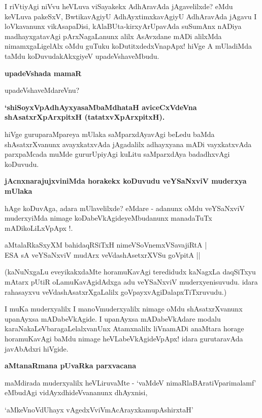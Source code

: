 I riVtiyAgi niVvu heVLuva viSayakekx AdhAravAda jAgavelilxde? eMdu keVLuva pakeSxV, BwtikavAgiyU AdhAyxtimxkavAgiyU AdhAravAda jAgavu I loVkavanunx vikAsapaDisi, kAlaBUta-kirxyArUpavAda suSumAnx nADiya madhayxgatavAgi pArxNagaLanunx alilx AsAvxdane mADi alilxMda nimamxgaLigelAlx oMdu guTuku koDutitxdedxVnapApx! hiVge A mUladiMda taMdu koDuvudakAkxgiyeV upadeVshaveMbudu.

{\bigskip
\noindent
{\large\bf upadeVshada mamaR}}\label{page83}
\medskip

\noindent
upadeVshaveMdareVnu? 

{\bf `shiSoyxVpAdhAyxyasaMbaMdhataH\label{83} aviceCxVdeVna shAsatxrXpArxpitxH (tatatxvXpArxpitxH). }

hiVge guruparaMpareya mUlaka saMparxdAyavAgi beLedu baMda shAsatxrXvanunx avayxkatxvAda jAgadalilx adhayxyana mADi vayxkatxvAda parxpaMcada muMde gururUpiyAgi kuLitu saMparxdAya badadhxvAgi koDuvudu.

{\bigskip
\noindent
{\large\bf jAcnxnarajujxviniMda horakekx koDuvudu veYSaNxviV muderxya mUlaka}}\label{page83a}
\medskip

\noindent
hAge koDuvAga, adara mUlavelilxde? eMdare - adanunx oMdu veYSaNxviV muderxyiMda nimage koDabeVkAgideyeMbudanunx manadaTuTx mADikoLiLxVpApx !.

\begin{shloka}
aMtalaRkaSxyXM bahidaqRSiTxH nimeVSoVnemxVSavajiRtA |\\\label{83a}
ESA sA veYSaNxviV mudArx veVdashAsetxrXVSu goVpitA ||
\end{shloka}

\noindent
(kaNuNxgaLu eveyikakxdaMte horamuKavAgi teredidudx kaNagxLa daqSiTxyu mAtarx pUtiR oLamuKavAgidAdxga adu veYSaNxviV muderxyenisuvudu. idara rahasayxvu veVdashAsatxrXgaLalilx goVpayxvAgiDalapxTiTxruvudu.) 

I muKa muderxyalilx I manoVmuderxyalilx nimage oMdu shAsatxrXvanunx upanAyxsa mADabeVkAgide. I upanAyxsa mADabeVkAdare modalu karaNakaLeVbaragaLelalxvanUnx Atamxnalilx liVnamADi anaMtara horage horamuKavAgi baMdu nimage heVLabeVkAgideVpApx! idara gurutaravAda javAbAdxri hiVgide.

{\bigskip
\noindent
{\large\bf aMtanaRmana pUvaRka parxvacana}}\label{page83b}
\medskip

\noindent
maMdirada muderxyalilx heVLiruvaMte - `vaMdeV nimaRlaBAratiVparimalamf' eMbudAgi vidAyxdhideVvananunx dhAyxnisi,

\begin{shloka}
`aMkeVnoVdUhayx vAgedxVviVmAcArayxkamupAshirxtaH'\label{page84}
\end{shloka}

